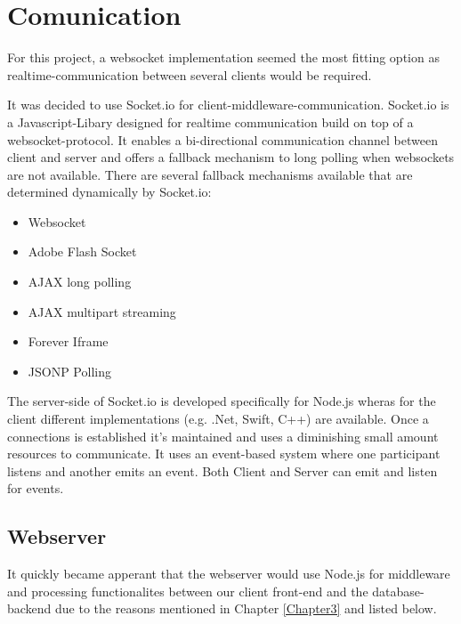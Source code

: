 \section{Comunication}

For this project, a websocket implementation seemed the most fitting option as realtime-communication between several clients would be required.
 
It was decided to use Socket.io for client-middleware-communication.
Socket.io is a Javascript-Libary designed for realtime communication build on top of a websocket-protocol.
It enables a bi-directional communication channel between client and server and offers a fallback mechanism to long polling when websockets are not available.
There are several fallback mechanisms available that are determined dynamically by Socket.io:
\begin{itemize}
    \item Websocket
    \item Adobe Flash Socket
    \item AJAX long polling
    \item AJAX multipart streaming
    \item Forever Iframe
    \item JSONP Polling
\end{itemize}

The server-side of Socket.io is developed  specifically for Node.js wheras for the client different implementations (e.g. .Net, Swift, C++)\parencite{socketioClients} are available.
Once a connections is established it's maintained and uses a diminishing small amount resources to communicate. 
It uses an event-based system where one participant listens and another emits an event. 
Both Client and Server can emit and listen for events.

\subsection{Webserver}
It quickly became apperant that the webserver would use Node.js for middleware and processing functionalites between our client front-end and the database-backend 
due to the reasons mentioned in Chapter \ref{Chapter3} and listed below.

